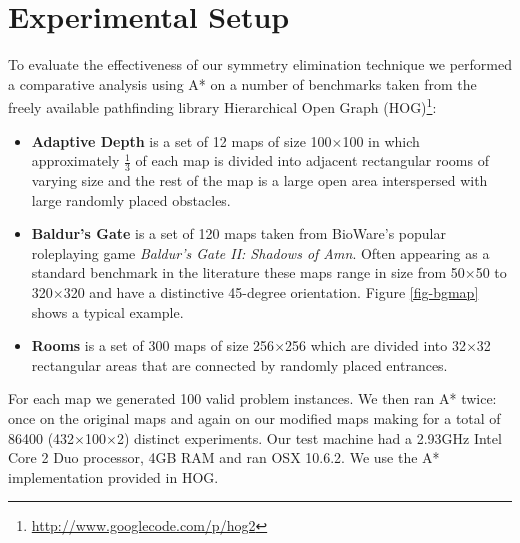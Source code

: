 \section{Experimental Setup}
To evaluate the effectiveness of our symmetry elimination technique we performed
a comparative analysis using A* on a number of benchmarks taken from
the freely available pathfinding library 
Hierarchical Open Graph (HOG)\footnote{\url{http://www.googlecode.com/p/hog2}}:
\begin{itemize}
\item{\textbf{Adaptive Depth} is a set of 12 maps of size 100$\times$100 in which approximately
$\frac{1}{3}$ of each map is divided into adjacent rectangular rooms of
varying size and the rest of the map is a large open area interspersed with 
large randomly placed obstacles.}
\item{\textbf{Baldur's Gate} is a set of 120 maps taken from BioWare's popular
roleplaying game \emph{Baldur's Gate II: Shadows of Amn}. 
Often appearing as a standard benchmark in the literature 
\cite{botea04,bjornsson05,bjornsson06,sturtevant05,harabor08} these maps range in 
size from 50$\times$50 to 320$\times$320 and have a distinctive 45-degree orientation.
Figure \ref{fig-bgmap} shows a typical example.}
\item{\textbf{Rooms} is a set of 300 maps of size 256$\times$256 which are divided into 32$\times$32
rectangular areas that are connected by randomly placed entrances.}
\end{itemize}

For each map we generated 100 valid problem instances. 
We then ran A* twice: once on the original maps and again on our modified maps making for
a total of 86400 (432$\times$100$\times$2) distinct experiments.
Our test machine had a 2.93GHz Intel Core 2 Duo processor, 4GB RAM and
ran OSX 10.6.2.
We use the A* implementation provided in HOG.
